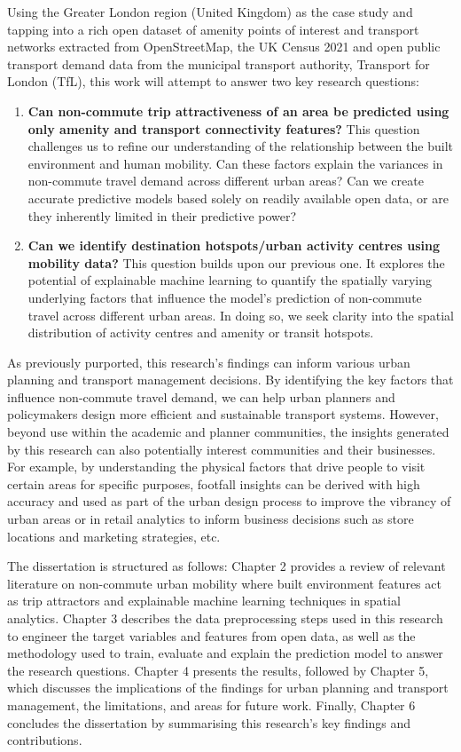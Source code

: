 Using the Greater London region (United Kingdom) as the case study and tapping into a rich open dataset of amenity points of interest and transport networks extracted from OpenStreetMap, the UK Census 2021 and open public transport demand data from the municipal transport authority, Transport for London (TfL), this work will attempt to answer two key research questions:

\begin{enumerate}
    \item \textbf{Can non-commute trip attractiveness of an area be predicted using only amenity and transport connectivity features?} This question challenges us to refine our understanding of the relationship between the built environment and human mobility. Can these factors explain the variances in non-commute travel demand across different urban areas? Can we create accurate predictive models based solely on readily available open data, or are they inherently limited in their predictive power?
    \item \textbf{Can we identify destination hotspots/urban activity centres using mobility data?} This question builds upon our previous one. It explores the potential of explainable machine learning to quantify the spatially varying underlying factors that influence the model's prediction of non-commute travel across different urban areas. In doing so, we seek clarity into the spatial distribution of activity centres and amenity or transit hotspots.
\end{enumerate}

As previously purported, this research's findings can inform various urban planning and transport management decisions. By identifying the key factors that influence non-commute travel demand, we can help urban planners and policymakers design more efficient and sustainable transport systems. However, beyond use within the academic and planner communities, the insights generated by this research can also potentially interest communities and their businesses. For example, by understanding the physical factors that drive people to visit certain areas for specific purposes, footfall insights can be derived with high accuracy and used as part of the urban design process to improve the vibrancy of urban areas or in retail analytics to inform business decisions such as store locations and marketing strategies, etc. 

The dissertation is structured as follows: Chapter 2 provides a review of relevant literature on non-commute urban mobility where built environment features act as trip attractors and explainable machine learning techniques in spatial analytics. Chapter 3 describes the data preprocessing steps used in this research to engineer the target variables and features from open data, as well as the methodology used to train, evaluate and explain the prediction model to answer the research questions. Chapter 4 presents the results, followed by Chapter 5, which discusses the implications of the findings for urban planning and transport management, the limitations, and areas for future work. Finally, Chapter 6 concludes the dissertation by summarising this research's key findings and contributions.